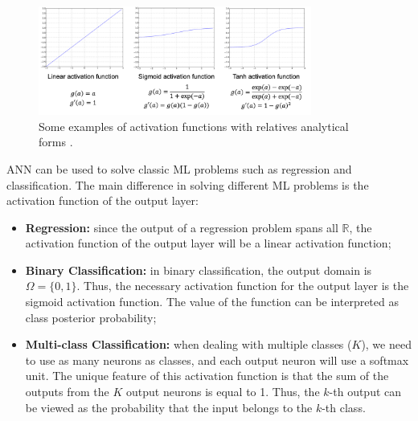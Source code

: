 \begin{figure}
    \centering
    \includegraphics[width=0.8\textwidth]{Images/activationfunction.png}
    \caption[Activation functions.]{Some examples of activation functions with relatives analytical forms \cite{matteo_matteucci_perceptrons_2021}.}
    \label{fig:actfunc}
\end{figure}
ANN can be used to solve classic ML problems such as regression and classification. The main difference in solving different ML problems is the activation function of the output layer: 
\begin{itemize}
    \item \textbf{Regression:} since the output of a regression problem spans all $\mathbb{R}$, the activation function of the output layer will be a linear activation function;
    \item \textbf{Binary Classification:} in binary classification, the output domain is $\Omega=\{0, 1\}$. Thus, the necessary activation function for the output layer is the sigmoid activation function. The value of the function can be interpreted as class posterior probability;
    \item \textbf{Multi-class Classification:} when dealing with multiple classes ($K$), we need to use as many neurons as classes, and each output neuron will use a softmax unit. The unique feature of this activation function is that the sum of the outputs from the $K$ output neurons is equal to 1. Thus, the $k$-th output can be viewed as the probability that the input belongs to the $k$-th class.
\end{itemize}
